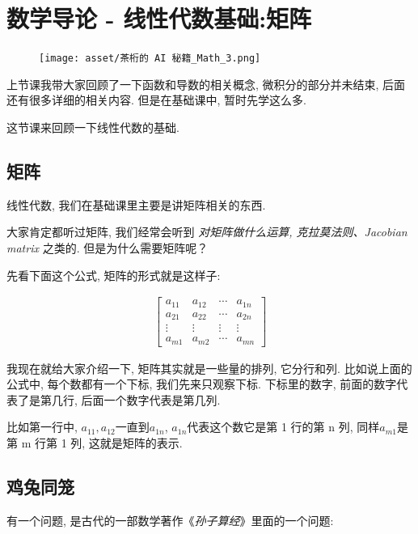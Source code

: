 \chapter{数学导论 - 线性代数基础:矩阵}


\begin{figure}[ht]
  \centering
  \texttt{[image: asset/茶桁的 AI 秘籍\_Math\_3.png]}
\end{figure}

\newpage

上节课我带大家回顾了一下函数和导数的相关概念, 微积分的部分并未结束, 后面还有很多详细的相关内容. 但是在基础课中, 暂时先学这么多. 

这节课来回顾一下线性代数的基础. 

\hypertarget{3.线性代数基础}{}
\section{矩阵}

线性代数, 我们在基础课里主要是讲矩阵相关的东西. 

大家肯定都听过矩阵, 我们经常会听到 \textit{对矩阵做什么运算, 克拉莫法则、Jacobian matrix} 之类的. 但是为什么需要矩阵呢？

先看下面这个公式, 矩阵的形式就是这样子:

\begin{align*}
  \begin{bmatrix}
    a_{11} & a_{12} & \cdots & a_{1n} \\
    a_{21} & a_{22} & \cdots & a_{2n} \\
    \vdots & \vdots & \vdots & \vdots \\
    a_{m1} & a_{m2} & \cdots & a_{mn}
  \end{bmatrix}
\end{align*}

我现在就给大家介绍一下, 矩阵其实就是一些量的排列, 它分行和列. 比如说上面的公式中, 每个数都有一个下标, 我们先来只观察下标. 下标里的数字, 前面的数字代表了是第几行, 后面一个数字代表是第几列. 

比如第一行中, $a_{11}, a_{12}$一直到$a_{1n}$, $a_{1n}$代表这个数它是第 1 行的第 n 列, 同样$a_{m1}$是第 m 行第 1 列, 这就是矩阵的表示. 

\section{鸡兔同笼}

有一个问题, 是古代的一部数学著作《\textit{孙子算经}》里面的一个问题:

